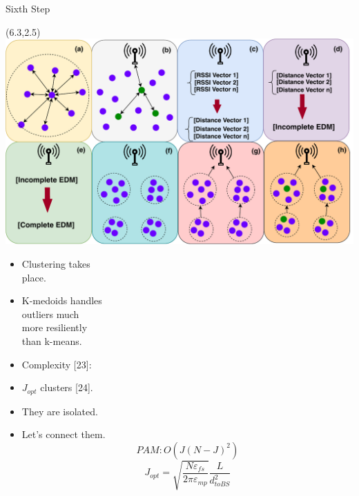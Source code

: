 \documentclass{beamer}
\begin{document}
\begin{frame}[t]{Sixth Step} %
\begin{textblock}{0.8}(6.3,2.5)
\includegraphics[scale=0.35]{figure/Steps.pdf}
\end{textblock}
\begin{itemize}

\item Clustering takes \\ place.

\item K-medoids handles \\ outliers much \\ more resiliently \\ than k-means.

\item Complexity [23]:

\item $J_{opt}$ clusters [24].

\item They are isolated.

\item Let's connect them.
\begin{equation}
PAM: O(J(N-J)^2)
\end{equation} 
\begin{equation}
J_{opt}=\sqrt{\frac{N \varepsilon_{fs}}{2\pi \varepsilon_{mp}}}\frac{L}{d_{toBS}^{2}}
\end{equation}


\end{itemize}
\end{frame}
\end{document}
